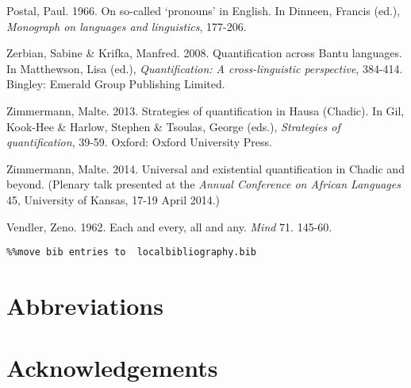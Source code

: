 \documentclass[output=paper]{langsci/langscibook}
\begin{document}
Postal, Paul. 1966. On so-called ‘pronouns’ in English. In Dinneen, Francis (ed.), \textit{Monograph on languages and linguistics}, 177-206.

Zerbian, Sabine \& Krifka, Manfred. 2008. Quantification across Bantu languages. In Matthewson, Lisa (ed.), \textit{Quantification: A cross-linguistic perspective}, 384-414. Bingley: Emerald Group Publishing Limited.

Zimmermann, Malte. 2013. Strategies of quantification in Hausa (Chadic). In Gil, Kook-Hee \& Harlow, Stephen \& Tsoulas, George (eds.), \textit{Strategies of quantification}, 39-59. Oxford: Oxford University Press.

Zimmermann, Malte. 2014. Universal and existential quantification in Chadic and beyond. (Plenary talk presented at the \textit{Annual Conference on African Languages }45, University of Kansas, 17-19 April 2014.)

Vendler, Zeno. 1962. Each and every, all and any. \textit{Mind }71. 145-60.  


\begin{verbatim}%%move bib entries to  localbibliography.bib
\end{verbatim}

\section*{Abbreviations}
\section*{Acknowledgements}

\printbibliography[heading=subbibliography,notkeyword=this]
\end{document}
